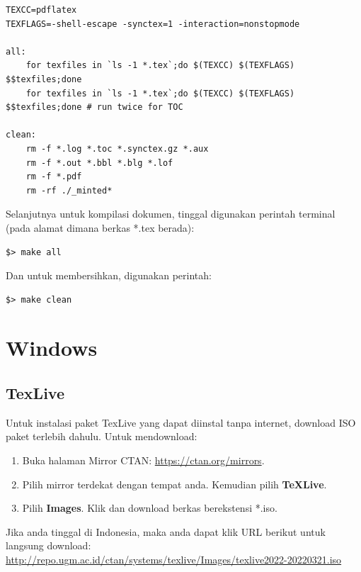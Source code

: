 \documentclass{book} %
\begin{document}
	\begin{verbatim}
TEXCC=pdflatex
TEXFLAGS=-shell-escape -synctex=1 -interaction=nonstopmode

all:
	for texfiles in `ls -1 *.tex`;do $(TEXCC) $(TEXFLAGS) $$texfiles;done
	for texfiles in `ls -1 *.tex`;do $(TEXCC) $(TEXFLAGS) $$texfiles;done # run twice for TOC

clean:
	rm -f *.log *.toc *.synctex.gz *.aux
	rm -f *.out *.bbl *.blg *.lof
	rm -f *.pdf
	rm -rf ./_minted*
	\end{verbatim}

	Selanjutnya untuk kompilasi dokumen, tinggal digunakan perintah terminal (pada alamat dimana berkas *.tex berada):

	\begin{verbatim}
$> make all
	\end{verbatim}

	Dan untuk membersihkan, digunakan perintah:

	\begin{verbatim}
$> make clean
	\end{verbatim}

	\section{Windows}

	\subsection{TexLive}

	Untuk instalasi paket TexLive yang dapat diinstal tanpa internet, download ISO paket terlebih dahulu.
	Untuk mendownload:
	\begin{enumerate}
		\item Buka halaman Mirror CTAN: \url{https://ctan.org/mirrors}.
		\item Pilih mirror terdekat dengan tempat anda. Kemudian pilih \textbf{\TeX Live}.
		\item Pilih \textbf{Images}. Klik dan download berkas berekstensi *.iso.
	\end{enumerate}

	Jika anda tinggal di Indonesia, maka anda dapat klik URL berikut untuk langsung download:\\
	\url{http://repo.ugm.ac.id/ctan/systems/texlive/Images/texlive2022-20220321.iso}
\end{document}

